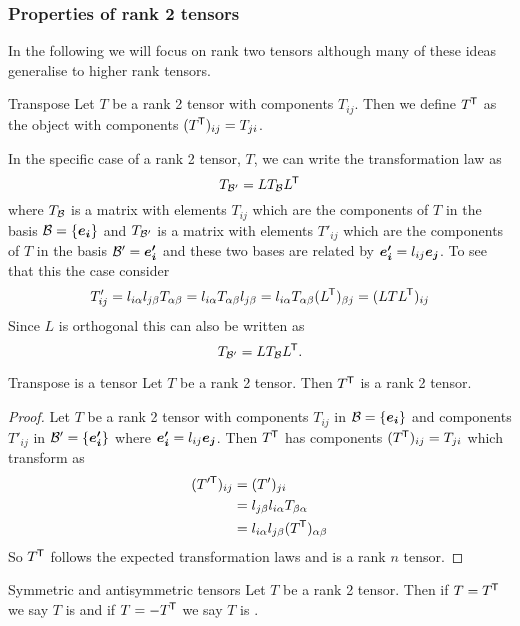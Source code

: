 \subsubsection{Properties of rank 2 tensors}
In the following we will focus on rank two tensors although many of these ideas generalise to higher rank tensors.
\begin{definition}{Transpose}{}
    Let \(T\) be a rank 2 tensor with components \(T_{ij}\).
    Then we define \(T^{\mkern-1.5mu\mathsf{T}}\) as the object with components \((T^{\mkern-1.5mu\mathsf{T}})_{ij} = T_{ji}\).
\end{definition}
In the specific case of a rank 2 tensor, \(T\), we can write the transformation law as
\[T_{\mathcal{B}'} = LT_{\mathcal{B}}L^{\mkern-1.5mu\mathsf{T}}\]
where \(T_{\mathcal{B}}\) is a matrix with elements \(T_{ij}\) which are the components of \(T\) in the basis \(\mathcal{B} = \{\bm{e_{i}}\}\) and \(T_{\mathcal{B}'}\) is a matrix with elements \(T'_{ij}\) which are the components of \(T\) in the basis \(\mathcal{B}' = \bm{e'_{i}}\) and these two bases are related by \(\bm{e'_{i}} = l_{ij}\bm{e_{j}}\).
To see that this the case consider
\[T'_{ij} = l_{i\alpha}l_{j\beta}T_{\alpha\beta} = l_{i\alpha}T_{\alpha\beta}l_{j\beta} = l_{i\alpha}T_{\alpha\beta}(L^{\mkern-1.5mu\mathsf{T}})_{\beta j} = (LTL^{\mkern-1.5mu\mathsf{T}})_{ij}\]
Since \(L\) is orthogonal this can also be written as
\[T_{\mathcal{B}'} = LT_{\mathcal{B}}L^{\mkern-1.5mu\mathsf{T}}.\]
\begin{lemma}{Transpose is a tensor}{}
    Let \(T\) be a rank 2 tensor.
    Then \(T^{\mkern-1.5mu\mathsf{T}}\) is a rank 2 tensor.
\end{lemma}
\begin{proof}
    Let \(T\) be a rank 2 tensor with components \(T_{ij}\) in \(\mathcal{B} = \{\bm{e_{i}}\}\) and components \(T'_{ij}\) in \(\mathcal{B}' = \{\bm{e'_{i}}\}\) where \(\bm{e'_{i}} = l_{ij}\bm{e_{j}}\).
    Then \(T^{\mkern-1.5mu\mathsf{T}}\) has components \((T^{\mkern-1.5mu\mathsf{T}})_{ij} = T_{ji}\) which transform as
    \begin{align*}
        ({T'}{^{\mkern-1.5mu\mathsf{T}}})_{ij} &= (T')_{ji}\\
        &= l_{j\beta}l_{i\alpha}T_{\beta\alpha}\\
        &= l_{i\alpha}l_{j\beta}(T^{\mkern-1.5mu\mathsf{T}})_{\alpha\beta}
    \end{align*}
    So \(T^{\mkern-1.5mu\mathsf{T}}\) follows the expected transformation laws and is a rank \(n\) tensor.
\end{proof}
\begin{definition}{Symmetric and antisymmetric tensors}{}
    Let \(T\) be a rank 2 tensor.
    Then if \(T = T^{\mkern-1.5mu\mathsf{T}}\) we say \(T\) is  and if \(T = -T^{\mkern-1.5mu\mathsf{T}}\) we say \(T\) is .
\end{definition}
